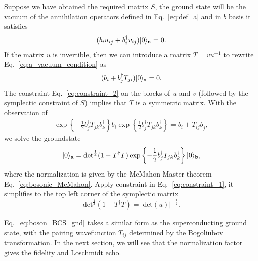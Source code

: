 Suppose we have obtained the required matrix $S$, the ground state will be the vacuum of the annihilation operators defined in Eq.~\eqref{eq:def_a} and in $b$ basis it satisfies
\begin{equation}\begin{aligned}
\label{eq:a_vacuum_condition}
(b_iu_{ij}+b_i^\dagger v_{ij})|0\rangle_{{\bf a}}=0.
\end{aligned}\end{equation}
If the matrix $u$ is invertible, then we can introduce a matrix $T=vu^{-1}$ to rewrite Eq.~\eqref{eq:a_vacuum_condition} as
\begin{equation}\begin{aligned}
(b_i+b_j^\dagger T_{ji})|0\rangle_{{\bf a}}=0. 
\end{aligned}\end{equation}
The constraint Eq.~\eqref{eq:constraint_2} on the blocks of $u$ and $v$ (followed by the symplectic constraint of $S$) implies that $T$ is a symmetric matrix. With the observation of 
\begin{equation}\begin{aligned}
\exp\left\{-\frac{1}{2}b_j^\dagger T_{jk}b_k^\dagger\right\}b_i\exp\left\{\frac{1}{2}b_j^\dagger T_{jk}b_k^\dagger\right\}=b_i+T_{ij}b^\dagger_j,
\end{aligned}\end{equation}
we solve the groundstate
\begin{equation}\begin{aligned}
\label{eq:boson_BCS_gnd}
|0\rangle_{{\bf a}}&=\text{det}^{\frac{1}{4}}(1-T^\dagger T)\exp\left\{-\frac{1}{2}b_j^\dagger T_{jk}b_k^\dagger\right\}|0\rangle_{\bf b},\\
\end{aligned}\end{equation}
where the normalization is given by the McMahon Master theorem Eq.~\eqref{eq:bosonic_McMahon}. Apply constraint in Eq.~\eqref{eq:constraint_1}, it simplifies to the top left corner of the symplectic matrix
\begin{equation}
\text{det}^{\frac{1}{4}}(1-T^\dagger T) =|\text{det}(u)|^{-\frac{1}{2}}.
\end{equation}

Eq.~\eqref{eq:boson_BCS_gnd} takes a similar form as the superconducting ground state, with the pairing wavefunction $T_{ij}$ determined by the Bogoliubov transformation. In the next section, we will see that the normalization factor gives the fidelity and Loschmidt echo.

